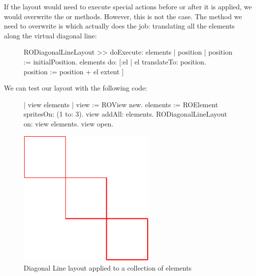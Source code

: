 \documentclass[a4paper,10pt,twoside]{book}
\begin{document}
If the layout would need to execute special actions before or after it is applied, we would overwrite the  or  methods. However, this is not the case. 
The method we need to overwrite is  which actually does the job: translating all the elements along the virtual diagonal line:

\begin{figure}[H]
\begin{code}{}
RODiagonalLineLayout >> doExecute: elements
	| position |	
	position := initialPosition.
	elements do: [:el | 
		el translateTo: position.
		position := position + el extent ] 
\end{code}
\end{figure}

We can test our layout with the following code:

\begin{figure}[H]
      \begin{minipage}[t]{0.61\textwidth}
      \vspace{0pt}
\begin{code}{}
| view elements |
view := ROView new.
elements := ROElement spritesOn: (1 to: 3).
view addAll: elements.
RODiagonalLineLayout on: view elements.
view open.
\end{code}
   \end{minipage}
   \hfill
   \begin{minipage}[t]{0.5\textwidth}
      \vspace{0pt}\raggedright
       \centering
		\includegraphics[width=0.6\textwidth]{diagonalLineLayout}
   \end{minipage}
\label{fig:diagonalLineLayout}
\caption{Diagonal Line layout applied to a collection of elements}
\end{figure} 
\end{document}
